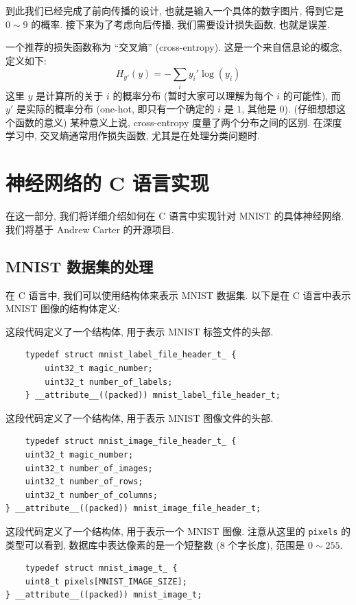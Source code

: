 \documentclass{ctexart}
\begin{document}
到此我们已经完成了前向传播的设计, 也就是输入一个具体的数字图片, 得到它是 $0 \sim 9$ 的概率. 接下来为了考虑向后传播, 我们需要设计损失函数,
也就是误差.

一个推荐的损失函数称为 ``交叉熵'' (cross-entropy)\cite{cover2006elements}. 这是一个来自信息论的概念, 定义如下:
$$
    H_{y'}(y) = -\sum_i y_i'\log(y_i)
$$
这里 $y$ 是计算所的关于 $i$ 的概率分布 (暂时大家可以理解为每个 $i$ 的可能性), 而 $y'$ 是实际的概率分布 (one-hot, 即只有一个确定的 $i$ 是 $1$, 其他是 $0$).
(仔细想想这个函数的意义) 某种意义上说, cross-entropy 度量了两个分布之间的区别. 在深度学习中, 交叉熵通常用作损失函数, 尤其是在处理分类问题时.

\section{神经网络的 C 语言实现}
\label{sec::implementation}

在这一部分, 我们将详细介绍如何在 C 语言中实现针对 MNIST 的具体神经网络. 我们将基于 Andrew Carter 的开源项目\cite{andrewcarteruk2018mnist}.

\subsection{MNIST 数据集的处理}

在 C 语言中, 我们可以使用结构体来表示 MNIST 数据集. 以下是在 C 语言中表示 MNIST 图像的结构体定义:

这段代码定义了一个结构体, 用于表示 MNIST 标签文件的头部.
\begin{verbatim}
    typedef struct mnist_label_file_header_t_ {  
        uint32_t magic_number;  
        uint32_t number_of_labels;  
    } __attribute__((packed)) mnist_label_file_header_t;          
\end{verbatim}

这段代码定义了一个结构体, 用于表示 MNIST 图像文件的头部.
\begin{verbatim}
    typedef struct mnist_image_file_header_t_ {  
    uint32_t magic_number;  
    uint32_t number_of_images;  
    uint32_t number_of_rows;  
    uint32_t number_of_columns;  
} __attribute__((packed)) mnist_image_file_header_t;  
\end{verbatim}

这段代码定义了一个结构体, 用于表示一个 MNIST 图像. 注意从这里的 \verb|pixels| 的类型可以看到,
数据库中表达像素的是一个短整数 ($8$ 个字长度), 范围是 $0 \sim 255$.
\begin{verbatim}
    typedef struct mnist_image_t_ {  
    uint8_t pixels[MNIST_IMAGE_SIZE];  
} __attribute__((packed)) mnist_image_t;  
\end{verbatim}
\end{document}
